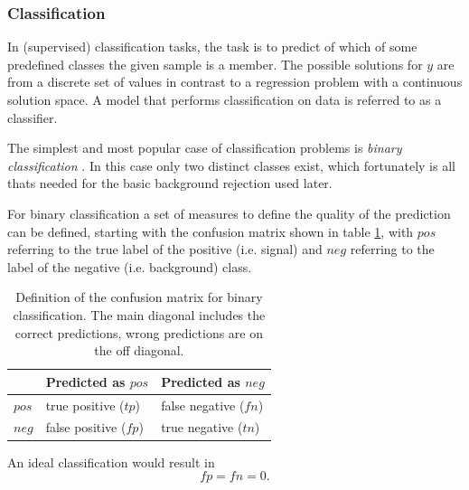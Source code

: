 \subsubsection{Classification}
In (supervised) classification tasks, the task is to predict of which of some
predefined classes the given sample is a member. The possible solutions for $y$
are from a discrete set of values in
contrast to a regression problem with a continuous solution space.
A model that performs classification on data is referred to as a
classifier.

The simplest and most popular case of classification problems
is \textit{binary classification} \cite{sokolova2009systematic}.
In this case only two distinct
classes exist, which fortunately is all thats needed for
the basic background rejection used later.

For binary classification a set of measures
to define the quality of the prediction can be defined, starting with the confusion matrix
shown in table \ref{tab:confusion},
with $pos$ referring to the true label of the positive (i.e. signal)
and $neg$ referring to the label of the negative (i.e. background) class.

\begin{table}
    \caption{Definition of the confusion matrix for binary classification.
    The main diagonal includes the correct predictions, wrong predictions are on the off diagonal.}
    \begin{center}
        \begin{tabular}{ l| l l}
            {} & Predicted as $pos$ & Predicted as $neg$ \\
            \hline
            $pos$ & true positive ($tp$) & false negative ($fn$) \\
            $neg$ & false positive ($fp$) & true negative ($tn$) \\
        \end{tabular}
    \end{center}
    \label{tab:confusion}
\end{table}

An ideal classification would result in
\begin{equation*}
  fp = fn = 0.
\end{equation*}


